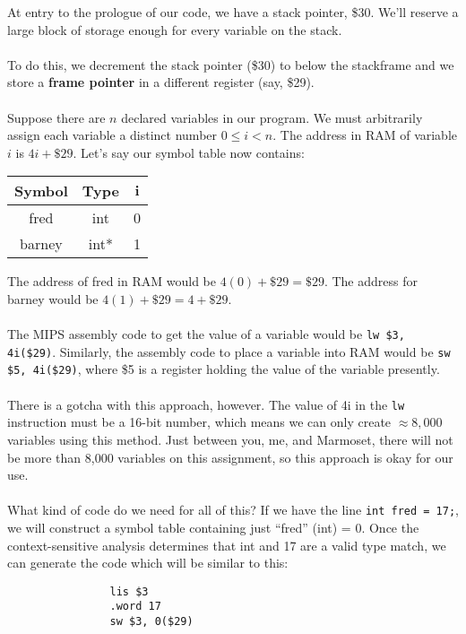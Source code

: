 \documentclass[]{article}
\theoremstyle{definition}
\begin{document}
				At entry to the prologue of our code, we have a stack pointer, \$30. We'll reserve a large block of storage \textendash{} enough for every variable \textendash{} on the stack.
				\\ \\
				To do this, we decrement the stack pointer (\$30) to below the stackframe and we store a \textbf{frame pointer} in a different register (say, \$29).
				\\ \\
				Suppose there are $n$ declared variables in our program. We must arbitrarily assign each variable a distinct number $0 \le i < n$. The address in RAM of variable $i$ is $4i + \$29$. Let's say our symbol table now contains:
				\begin{center}
					\begin{tabular}{|c|c|c|}
						\hline
						\textbf{Symbol} & \textbf{Type} & $\boldsymbol{i}$ \\ \hline
						fred & int & 0 \\
						barney & int* & 1 \\ \hline
					\end{tabular}
				\end{center}

				The address of fred in RAM would be $4(0) + \$29 = \$29$. The address for barney would be $4(1) + \$29 = 4 + \$29$.
				\\ \\
				The MIPS assembly code to get the value of a variable would be \verb+lw $3, 4i($29)+. Similarly, the assembly code to place a variable into RAM would be \verb+sw $5, 4i($29)+, where \$5 is a register holding the value of the variable presently.
				\\ \\
				There is a gotcha with this approach, however. The value of 4i in the \verb+lw+ instruction must be a 16-bit number, which means we can only create $\approx 8,000$ variables using this method. Just between you, me, and Marmoset, there will not be more than 8,000 variables on this assignment, so this approach is okay for our use.
				\\ \\
				What kind of code do we need for all of this? If we have the line \verb+int fred = 17;+, we will construct a symbol table containing just ``fred'' (int) = 0. Once the context-sensitive analysis determines that int and 17 are a valid type match, we can generate the code which will be similar to this:
				\begin{verbatim}
				lis $3
				.word 17
				sw $3, 0($29)
				\end{verbatim}
\end{document}
